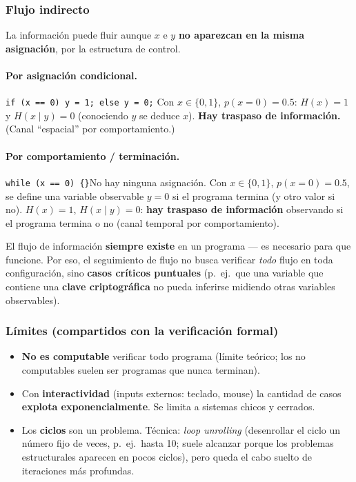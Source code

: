 \documentclass[../main.tex]{subfiles}
\begin{document}
\subsubsection{Flujo indirecto}

La información puede fluir aunque $x$ e $y$ \textbf{no aparezcan en la misma
asignación}, por la estructura de control.

\paragraph{Por asignación condicional.} \verb|if (x == 0) y = 1; else y = 0;|\quad
Con $x\in\{0,1\}$, $p(x{=}0)=0.5$: $H(x)=1$ y $H(x\mid y)=0$ (conociendo $y$ se
deduce $x$). \textbf{Hay traspaso de información.} (Canal ``espacial'' por
comportamiento.)

\paragraph{Por comportamiento / terminación.} \verb|while (x == 0) {}|\quad No hay
ninguna asignación. Con $x\in\{0,1\}$, $p(x{=}0)=0.5$, se define una variable
observable $y=0$ si el programa termina (y otro valor si no). $H(x)=1$,
$H(x\mid y)=0$: \textbf{hay traspaso de información} observando si el programa
termina o no (canal temporal por comportamiento).

\begin{destacado}
El flujo de información \textbf{siempre existe} en un programa --- es necesario
para que funcione. Por eso, el seguimiento de flujo no busca verificar
\emph{todo} flujo en toda configuración, sino \textbf{casos críticos puntuales}
(p.\ ej.\ que una variable que contiene una \textbf{clave criptográfica} no pueda
inferirse midiendo otras variables observables).
\end{destacado}

\subsubsection{Límites (compartidos con la verificación formal)}
\begin{itemize}[noitemsep]
  \item \textbf{No es computable} verificar todo programa (límite teórico; los no
        computables suelen ser programas que nunca terminan).
  \item Con \textbf{interactividad} (inputs externos: teclado, mouse) la cantidad
        de casos \textbf{explota exponencialmente}. Se limita a sistemas chicos y
        cerrados.
  \item Los \textbf{ciclos} son un problema. Técnica: \textit{loop unrolling}
        (desenrollar el ciclo un número fijo de veces, p.\ ej.\ hasta 10; suele
        alcanzar porque los problemas estructurales aparecen en pocos ciclos), pero
        queda el cabo suelto de iteraciones más profundas.
\end{itemize}
\end{document}
